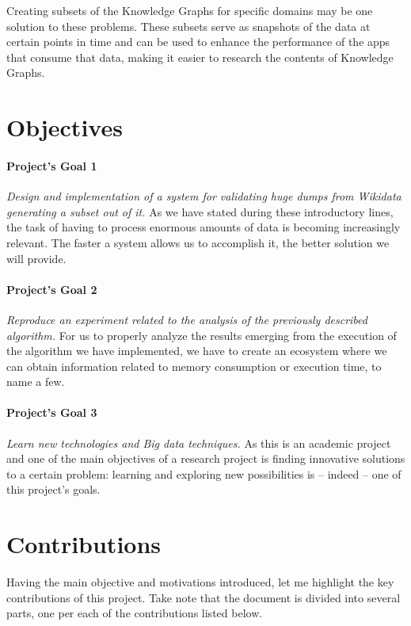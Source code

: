 Creating subsets of the Knowledge Graphs for specific domains may be one solution to these problems. These subsets serve as snapshots of the data at certain points in time and can be used to enhance the performance of the apps that consume that data, making it easier to research the contents of Knowledge Graphs.

\section{Objectives}

\paragraph{Project's Goal 1}
\textit{Design and implementation of a system for validating huge dumps from Wikidata generating a subset out of it.} As we have stated during these introductory lines, the task of having to process enormous amounts of data is becoming increasingly relevant. The faster a system allows us to accomplish it, the better solution we will provide.

\paragraph{Project's Goal 2}
\textit{Reproduce an experiment related to the analysis of the previously described algorithm.} For us to properly analyze the results emerging from the execution of the algorithm we have implemented, we have to create an ecosystem where we can obtain information related to memory consumption or execution time, to name a few.

\paragraph{Project's Goal 3}
\textit{Learn new technologies and Big data techniques.} As this is an academic project and one of the main objectives of a research project is finding innovative solutions to a certain problem: learning and exploring new possibilities is -- indeed -- one of this project's goals.

\section{Contributions}

Having the main objective and motivations introduced, let me highlight the key contributions of this project. Take note that the document is divided into several parts, one per each of the contributions listed below.

